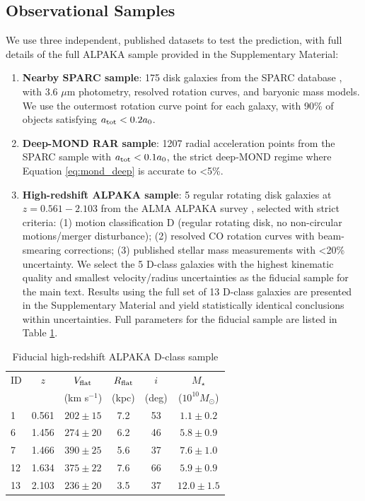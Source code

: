 \documentclass[fleqn,usenatbib]{mnras}
\newcommand{\atot}{a_{\rm tot}}
\newcommand{\aMOND}{a_0}
\begin{document}
\subsection{Observational Samples}
We use three independent, published datasets to test the prediction, with full details of the full ALPAKA sample provided in the Supplementary Material:
\begin{enumerate}
\item \textbf{Nearby SPARC sample}: 175 disk galaxies from the SPARC database \citep{Lelli2016}, with 3.6 $\mu$m photometry, resolved rotation curves, and baryonic mass models. We use the outermost rotation curve point for each galaxy, with 90\% of objects satisfying $\atot < 0.2\aMOND$.
\item \textbf{Deep-MOND RAR sample}: 1207 radial acceleration points from the SPARC sample with $\atot < 0.1\aMOND$, the strict deep-MOND regime where Equation \ref{eq:mond_deep} is accurate to <5\%.
\item \textbf{High-redshift ALPAKA sample}: 5 regular rotating disk galaxies at $z=0.561-2.103$ from the ALMA ALPAKA survey \citep{Rizzo2023}, selected with strict criteria: (1) motion classification D (regular rotating disk, no non-circular motions/merger disturbance); (2) resolved CO rotation curves with beam-smearing corrections; (3) published stellar mass measurements with <20\% uncertainty. We select the 5 D-class galaxies with the highest kinematic quality and smallest velocity/radius uncertainties as the fiducial sample for the main text. Results using the full set of 13 D-class galaxies are presented in the Supplementary Material and yield statistically identical conclusions within uncertainties. Full parameters for the fiducial sample are listed in Table \ref{tab:highz}.
\end{enumerate}

\begin{table}
\centering
\setlength{\tabcolsep}{3pt}
\caption{Fiducial high-redshift ALPAKA D-class sample}
\label{tab:highz}
\footnotesize
\begin{tabular}{@{}lccccc@{}}
\toprule
ID & $z$ & $V_{\rm flat}$ & $R_{\rm flat}$ & $i$ & $M_\star$ \\
& & (km s$^{-1}$) & (kpc) & (deg) & ($10^{10}M_\odot$) \\
\midrule
1 & 0.561 & $202\pm15$ & 7.2 & 53 & $1.1\pm0.2$ \\
6 & 1.456 & $274\pm20$ & 6.2 & 46 & $5.8\pm0.9$ \\
7 & 1.466 & $390\pm25$ & 5.6 & 37 & $7.6\pm1.0$ \\
12 & 1.634 & $375\pm22$ & 7.6 & 66 & $5.9\pm0.9$ \\
13 & 2.103 & $236\pm20$ & 3.5 & 37 & $12.0\pm1.5$ \\
\bottomrule
\end{tabular}
\end{table}
\end{document}
